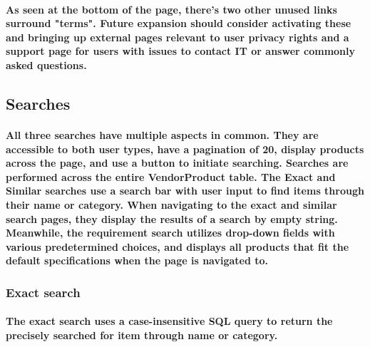 \documentclass[sigconf]{acmart}
\begin{document}
\paragraph{As seen at the bottom of the page, there's two other unused links surround "terms". Future expansion should consider activating these and bringing up external pages relevant to user privacy rights and a support page for users with issues to contact IT or answer commonly asked questions. }

\subsection{Searches}

\paragraph{All three searches have multiple aspects in common. They are accessible to both user types, have a pagination of 20, display products across the page, and use a button to initiate searching. Searches are performed across the entire VendorProduct table. The Exact and Similar searches use a search bar with user input to find items through their name or category. When navigating to the exact and similar search pages, they display the results of a search by empty string. Meanwhile, the requirement search utilizes drop-down fields with various predetermined choices, and displays all products that fit the default specifications when the page is navigated to.}     

\subsubsection{Exact search}

\paragraph{The exact search uses a case-insensitive SQL query to return the precisely searched for item through name or category.}  
\end{document}
